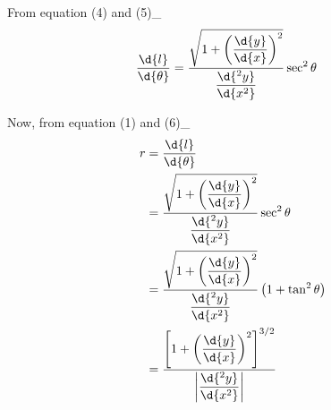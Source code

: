\documentclass{article}
\begin{document}
From equation (4) and (5)\_
\begin{align}
\dfrac{\d{l}}{\d{\theta}} &= \dfrac{\sqrt{1+ \left( \dfrac{\d{y}}{\d{x}} \right)^2}}{\dfrac{\d{^2y}}{\d{x^2}}} \sec^2\theta
\end{align}


Now, from equation (1) and (6)\_
\begin{align*}
r &= \dfrac{\d{l}}{\d{\theta}}\\
	&= \dfrac{\sqrt{1+ \left( \dfrac{\d{y}}{\d{x}} \right)^2}}{\dfrac{\d{^2y}}{\d{x^2}}} \sec^2\theta \\
	&= \dfrac{\sqrt{1+ \left( \dfrac{\d{y}}{\d{x}} \right)^2}}{\dfrac{\d{^2y}}{\d{x^2}}} \left( 1 + \tan^2\theta\right) \\
	&=\dfrac{\left[1 + \left(\dfrac{\d{y}}{\d{x}}\right)^2 \right]^{3/2}}{\left| \dfrac{\d{^2y}}{\d{x^2}} \right|}
\end{align*}
\end{document}
